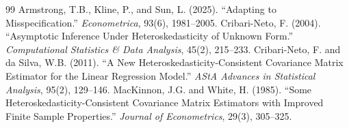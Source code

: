 \documentclass[12pt]{article}
\theoremstyle{definition}
\theoremstyle{remark}
\begin{document}
\begin{thebibliography}{99}
 Armstrong, T.B., Kline, P., and Sun, L. (2025). ``Adapting to Misspecification.'' \textit{Econometrica}, 93(6), 1981--2005.
 Cribari-Neto, F. (2004). ``Asymptotic Inference Under Heteroskedasticity of Unknown Form.'' \textit{Computational Statistics \& Data Analysis}, 45(2), 215--233.
 Cribari-Neto, F. and da Silva, W.B. (2011). ``A New Heteroskedasticity-Consistent Covariance Matrix Estimator for the Linear Regression Model.'' \textit{AStA Advances in Statistical Analysis}, 95(2), 129--146.
 MacKinnon, J.G. and White, H. (1985). ``Some Heteroskedasticity-Consistent Covariance Matrix Estimators with Improved Finite Sample Properties.'' \textit{Journal of Econometrics}, 29(3), 305--325.
\end{thebibliography}
\end{document}
